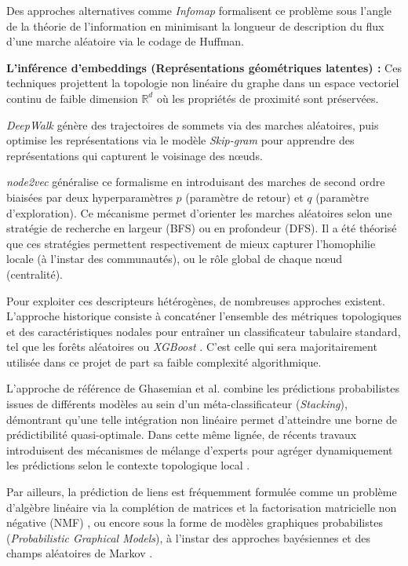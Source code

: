 Des approches alternatives comme \textit{Infomap} \cite{infomap2008} formalisent ce problème sous l'angle de la théorie de l'information \cite{infotheory2023} en minimisant la longueur de description du flux d'une marche aléatoire via le codage de Huffman.

\vspace{4px}

\textbf{L'inférence d'embeddings (Représentations géométriques latentes) :} Ces techniques projettent la topologie non linéaire du graphe dans un espace vectoriel continu de faible dimension $\mathbb{R}^d$ où les propriétés de proximité sont préservées. 

\textit{DeepWalk} \cite{deepwalk2014} génère des trajectoires de sommets via des marches aléatoires, puis optimise les représentations via le modèle \textit{Skip-gram} pour apprendre des représentations qui capturent le voisinage des nœuds.

\textit{node2vec} \cite{node2vec2016} généralise ce formalisme en introduisant des marches de second ordre biaisées par deux hyperparamètres $p$ (paramètre de retour) et $q$ (paramètre d'exploration). Ce mécanisme permet d'orienter les marches aléatoires selon une stratégie de recherche en largeur (BFS) ou en profondeur (DFS). Il a été théorisé que ces stratégies permettent respectivement de mieux capturer l'homophilie locale (à l'instar des communautés), ou le rôle global de chaque nœud (centralité).

Pour exploiter ces descripteurs hétérogènes, de nombreuses approches existent. L'approche historique consiste à concaténer l'ensemble des métriques topologiques et des caractéristiques nodales pour entraîner un classificateur tabulaire standard, tel que les forêts aléatoires ou \textit{XGBoost} \cite{lichtenwalter2010link}. C'est celle qui sera majoritairement utilisée dans ce projet de part sa faible complexité algorithmique.

L'approche de référence de Ghasemian et al. \cite{01stackingLinkPred}  combine les prédictions probabilistes issues de différents modèles au sein d'un méta-classificateur (\textit{Stacking}), démontrant qu'une telle intégration non linéaire permet d'atteindre une borne de prédictibilité quasi-optimale. Dans cette même lignée, de récents travaux introduisent des mécanismes de mélange d'experts pour agréger dynamiquement les prédictions selon le contexte topologique local \cite{ma2024mixture}.

Par ailleurs, la prédiction de liens est fréquemment formulée comme un problème d'algèbre linéaire via la complétion de matrices et la factorisation matricielle non négative (NMF) \cite{menon2011link}, ou encore sous la forme de modèles graphiques probabilistes (\textit{Probabilistic Graphical Models}), à l'instar des approches bayésiennes et des champs aléatoires de Markov \cite{taskar2003link}.

